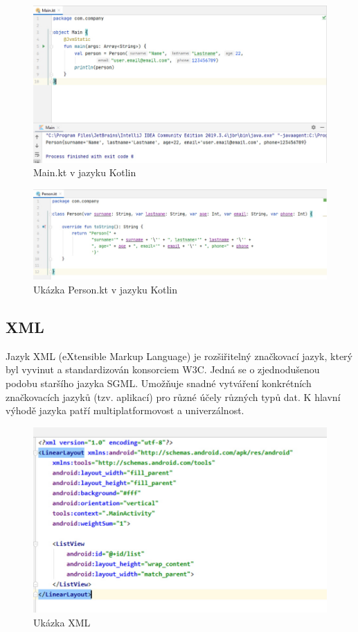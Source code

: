 \documentclass{vskpou} %
\begin{document}
 \begin{figure}[h!]
\centering
\includegraphics[scale=0.5]{images/11.jpg}
\caption{Main.kt v jazyku Kotlin}
\label{11}
\end{figure}

 \begin{figure}[h!]
\centering
\includegraphics[scale=0.5]{images/12.jpg}
\caption{Ukázka Person.kt v jazyku Kotlin}
\label{12}
\end{figure}

\subsection{XML}
Jazyk XML (eXtensible Markup Language) je rozšiřitelný značkovací jazyk, který byl vyvinut a standardizován konsorciem W3C. Jedná se o zjednodušenou podobu staršího jazyka SGML. Umožňuje snadné vytváření konkrétních značkovacích jazyků (tzv. aplikací) pro různé účely různých typů dat. K hlavní výhodě jazyka patří multiplatformovost a univerzálnost.\cite{8} 

 \begin{figure}[h!]
\centering
\includegraphics[scale=0.5]{images/13.jpg}
\caption{Ukázka XML}
\label{13}
\end{figure}
\newpage
\end{document}
